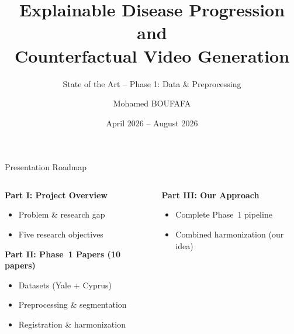 \documentclass[aspectratio=169,xcolor=dvipsnames]{beamer}
\title{Explainable Disease Progression and\\Counterfactual Video Generation}
\subtitle{State of the Art -- Phase 1: Data \& Preprocessing}
\author{Mohamed BOUFAFA}
\institute
{
    Mitacs Globalink Research Internship 2026 \\[0.3em]
    T\'{E}LUQ University, Montreal, Canada \\[0.5em]
    \textbf{Supervisors:} \\
    Dr. Belkacem Chikhaoui (T\'{E}LUQ) \\
    Dr. Belkacem Khaldi (Algeria)
}
\date{April 2026 -- August 2026}
\begin{document}
\begin{frame}
    \titlepage
\end{frame}

\begin{frame}{Presentation Roadmap}
    \begin{columns}[t]
        \begin{column}{0.48\textwidth}
            \begin{block}{\textbf{Part I: Project Overview}}
                \begin{itemize}
                    \item Problem \& research gap
                    \item Five research objectives
                \end{itemize}
            \end{block}

            \vspace{0.3em}

            \begin{block}{\textbf{Part II: Phase~1 Papers (10 papers)}}
                \begin{itemize}
                    \item Datasets (Yale + Cyprus)
                    \item Preprocessing \& segmentation
                    \item Registration \& harmonization
                \end{itemize}
            \end{block}
        \end{column}

        \begin{column}{0.48\textwidth}
            \begin{block}{\textbf{Part III: Our Approach}}
                \begin{itemize}
                    \item Complete Phase~1 pipeline
                    \item Combined harmonization (our idea)
                \end{itemize}
            \end{block}


\end{column}
\end{columns}
\end{frame}
\end{document}
